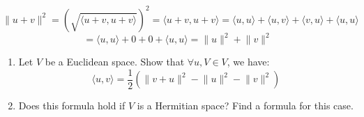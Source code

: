 \documentclass[12pt]{article}
\begin{document}
\begin{proofbox}
$$
\lVert u + v \rVert^2 = (\sqrt{\langle u+v, u+v \rangle})^2 = \langle u+v, u+v \rangle = \langle u, u \rangle + \langle u, v \rangle + \langle v, u \rangle + \langle u, u \rangle
$$
$$
= \langle u, u \rangle + 0 + 0 + \langle u, u \rangle = \lVert u \rVert^2 + \lVert v \rVert^2
$$
\end{proofbox}

\begin{exercise}{}{}
\begin{enumerate}
    \item Let $V$ be a Euclidean space. Show that $\forall u, V \in V$, we have:
    $$
    \langle u, v \rangle = \frac{1}{2}\left(\lVert v+u \rVert^2 - \lVert u \rVert^2 - \lVert v \rVert^2\right)
    $$
    \item Does this formula hold if $V$ is a Hermitian space? Find a formula for this case.
\end{enumerate}
\end{exercise}
\end{document}
